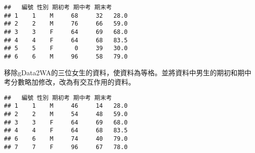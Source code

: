\documentclass[
]{book}
\newenvironment{Shaded}{\begin{snugshade}}{\end{snugshade}}
\newcommand{\DecValTok}[1]{\textcolor[rgb]{0.00,0.00,0.81}{#1}}
\newcommand{\FunctionTok}[1]{\textcolor[rgb]{0.00,0.00,0.00}{#1}}
\newcommand{\NormalTok}[1]{#1}
\newcommand{\OtherTok}[1]{\textcolor[rgb]{0.56,0.35,0.01}{#1}}
\newcommand{\SpecialCharTok}[1]{\textcolor[rgb]{0.00,0.00,0.00}{#1}}
\newcommand{\StringTok}[1]{\textcolor[rgb]{0.31,0.60,0.02}{#1}}
\begin{document}
\begin{verbatim}
##   編號 性別 期初考 期中考 期末考
## 1    1    M     68     32   28.0
## 2    2    M     76     66   59.0
## 3    3    F     64     69   68.0
## 4    4    F     64     68   83.5
## 5    5    F      0     39   30.0
## 6    6    M     96     58   79.0
\end{verbatim}

移除gData2WA的三位女生的資料，使資料為等格。並將資料中男生的期初和期中考分數略加修改，改為有交互作用的資料。

\begin{Shaded}
\end{Shaded}

\begin{verbatim}
##   編號 性別 期初考 期中考 期末考
## 1    1    M     46     14   28.0
## 2    2    M     54     48   59.0
## 3    3    F     64     69   68.0
## 4    4    F     64     68   83.5
## 6    6    M     74     40   79.0
## 7    7    F     96     67   78.0
\end{verbatim}
\end{document}
